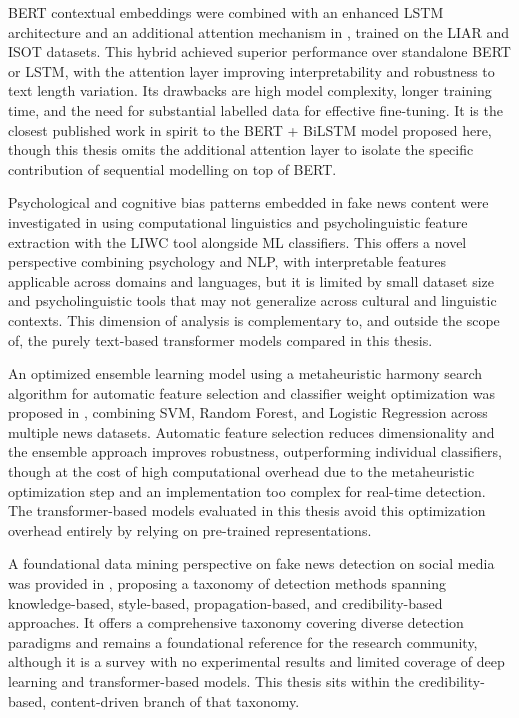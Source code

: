 BERT contextual embeddings were combined with an enhanced LSTM architecture and an additional attention mechanism in \citep{Rai2022FakeNews}, trained on the LIAR and ISOT datasets. This hybrid achieved superior performance over standalone BERT or LSTM, with the attention layer improving interpretability and robustness to text length variation. Its drawbacks are high model complexity, longer training time, and the need for substantial labelled data for effective fine-tuning. It is the closest published work in spirit to the BERT + BiLSTM model proposed here, though this thesis omits the additional attention layer to isolate the specific contribution of sequential modelling on top of BERT.

Psychological and cognitive bias patterns embedded in fake news content were investigated in \citep{CarrascoFarre2022Fingerprints} using computational linguistics and psycholinguistic feature extraction with the LIWC tool alongside ML classifiers. This offers a novel perspective combining psychology and NLP, with interpretable features applicable across domains and languages, but it is limited by small dataset size and psycholinguistic tools that may not generalize across cultural and linguistic contexts. This dimension of analysis is complementary to, and outside the scope of, the purely text-based transformer models compared in this thesis.

An optimized ensemble learning model using a metaheuristic harmony search algorithm for automatic feature selection and classifier weight optimization was proposed in \citep{Huang2020FakeNews}, combining SVM, Random Forest, and Logistic Regression across multiple news datasets. Automatic feature selection reduces dimensionality and the ensemble approach improves robustness, outperforming individual classifiers, though at the cost of high computational overhead due to the metaheuristic optimization step and an implementation too complex for real-time detection. The transformer-based models evaluated in this thesis avoid this optimization overhead entirely by relying on pre-trained representations.

A foundational data mining perspective on fake news detection on social media was provided in \citep{Shu2017FakeNewsDetection}, proposing a taxonomy of detection methods spanning knowledge-based, style-based, propagation-based, and credibility-based approaches. It offers a comprehensive taxonomy covering diverse detection paradigms and remains a foundational reference for the research community, although it is a survey with no experimental results and limited coverage of deep learning and transformer-based models. This thesis sits within the credibility-based, content-driven branch of that taxonomy.

